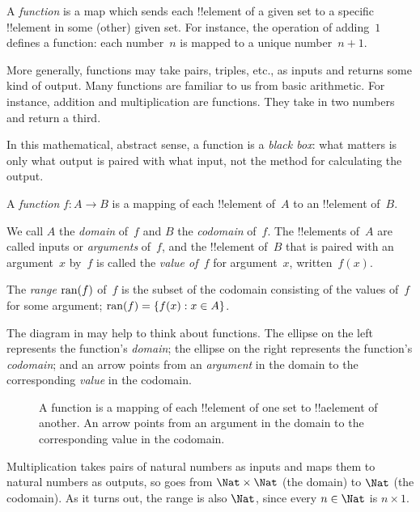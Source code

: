 \documentclass[../../../include/open-logic-section]{subfiles}
\begin{document}

\begin{explain}
A \emph{function} is a map which sends each !!{element} of a given set
to a specific !!{element} in some (other) given set. For instance, the
operation of adding~$1$ defines a function: each number~$n$ is mapped
to a unique number~$n+1$. 
  
More generally, functions may take pairs, triples, etc., as inputs and
returns some kind of output. Many functions are familiar to us from
basic arithmetic. For instance, addition and multiplication are
functions. They take in two numbers and return a third.

In this mathematical, abstract sense, a function is a \emph{black
box}: what matters is only what output is paired with what input, not
the method for calculating the output.
\end{explain}

\begin{defn}[Function]
A \emph{function} $f \colon A \to B$ is a mapping of each !!{element}
of~$A$ to an !!{element} of~$B$.

We call $A$ the \emph{domain} of~$f$ and $B$ the \emph{codomain}
of~$f$.  The !!{element}s of~$A$ are called inputs or \emph{arguments}
of~$f$, and the !!{element} of~$B$ that is paired with an argument~$x$
by~$f$ is called the \emph{value of~$f$} for argument~$x$,
written~$f(x)$.

The \emph{range} $\mathrm{ran}(f)$ of~$f$ is the subset of the codomain
consisting of the values of~$f$ for some argument; $\mathrm{ran}(f) =
\{ f(x) : x \in A \}$.
\end{defn}

The diagram in  may help to think about functions. The ellipse
on the left represents the function's \emph{domain}; the ellipse on
the right represents the function's \emph{codomain}; and an arrow
points from an \emph{argument} in the domain to the corresponding
\emph{value} in the codomain.

\begin{figure}
  \caption{A function is a mapping of each !!{element} of one set to
    !!a{element} of another. An arrow points from an argument in the
    domain to the corresponding value in the codomain.}
\end{figure}

\begin{ex}
Multiplication takes pairs of natural numbers as inputs and maps them
to natural numbers as outputs, so goes from $\Nat \times \Nat$ (the
domain) to $\Nat$ (the codomain). As it turns out, the range is also
$\Nat$, since every $n \in \Nat$ is $n \times 1$.
\end{ex}
\end{document}
